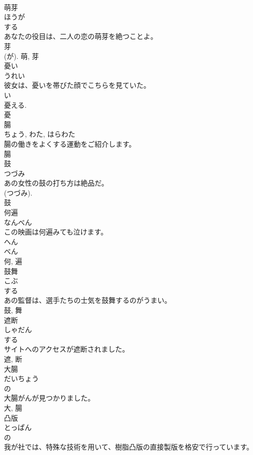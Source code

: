 \documentclass[8pt]{extreport}
\begin{document}
\begin{CJK}{UTF8}{min}
\\	萌芽	
\\	ほうが	
\\	する 
\\	あなたの役目は、二人の恋の萌芽を絶つことよ。	
\\	芽 
\\	(が).	萌, 芽	
\\	憂い	
\\	うれい	
\\	彼女は、憂いを帯びた顔でこちらを見ていた。	
\\	い 
\\	憂える. 
\\	憂	
\\	腸	
\\	ちょう, わた, はらわた	
\\	腸の働きをよくする運動をご紹介します。	
\\	腸	
\\	鼓	
\\	つづみ	
\\	あの女性の鼓の打ち方は絶品だ。	
\\	(つづみ). 
\\	鼓	
\\	何遍	
\\	なんべん	
\\	この映画は何遍みても泣けます。	
\\	へん 
\\	べん 
\\	何, 遍	
\\	鼓舞	
\\	こぶ	
\\	する 
\\	あの監督は、選手たちの士気を鼓舞するのがうまい。	
\\	鼓, 舞	
\\	遮断	
\\	しゃだん	
\\	する 
\\	サイトへのアクセスが遮断されました。	
\\	遮, 断	
\\	大腸	
\\	だいちょう	
\\	の 
\\	大腸がんが見つかりました。	
\\	大, 腸	
\\	凸版	
\\	とっぱん	
\\	の 
\\	我が社では、特殊な技術を用いて、樹脂凸版の直接製版を格安で行っています。	

\end{CJK}
\end{document}
